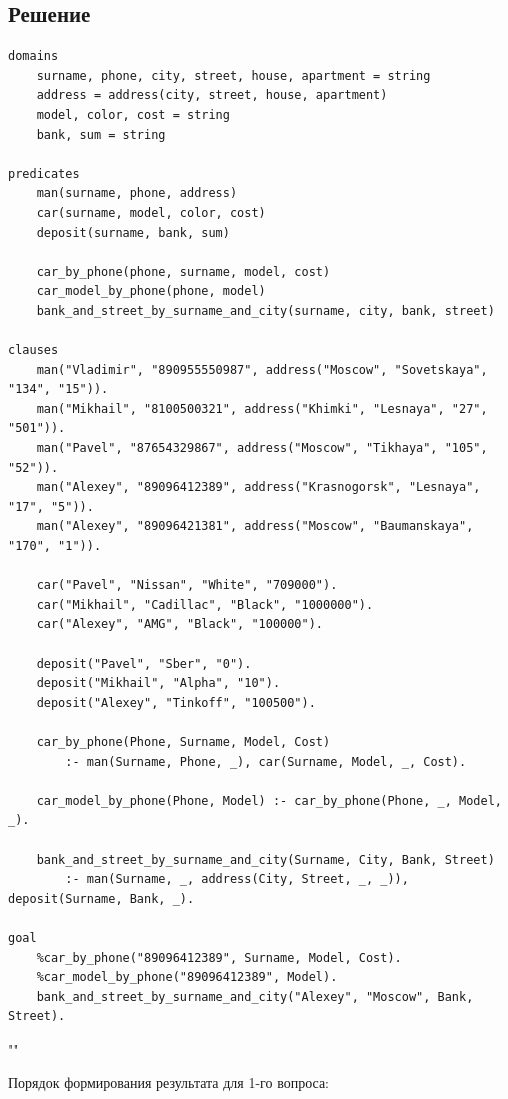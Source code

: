 \documentclass[12pt]{report}
\begin{document}
\subsection*{Решение}
\begin{lstlisting}
domains
	surname, phone, city, street, house, apartment = string
	address = address(city, street, house, apartment)
	model, color, cost = string
	bank, sum = string

predicates
	man(surname, phone, address)
	car(surname, model, color, cost)
	deposit(surname, bank, sum)
	
	car_by_phone(phone, surname, model, cost)
	car_model_by_phone(phone, model)
	bank_and_street_by_surname_and_city(surname, city, bank, street)

clauses
	man("Vladimir", "890955550987", address("Moscow", "Sovetskaya", "134", "15")).
	man("Mikhail", "8100500321", address("Khimki", "Lesnaya", "27", "501")).
	man("Pavel", "87654329867", address("Moscow", "Tikhaya", "105", "52")).
	man("Alexey", "89096412389", address("Krasnogorsk", "Lesnaya", "17", "5")).
	man("Alexey", "89096421381", address("Moscow", "Baumanskaya", "170", "1")).
	
	car("Pavel", "Nissan", "White", "709000").
	car("Mikhail", "Cadillac", "Black", "1000000").
	car("Alexey", "AMG", "Black", "100000").
	
	deposit("Pavel", "Sber", "0").
	deposit("Mikhail", "Alpha", "10").
	deposit("Alexey", "Tinkoff", "100500").
	
	car_by_phone(Phone, Surname, Model, Cost)
		:- man(Surname, Phone, _), car(Surname, Model, _, Cost).
	
	car_model_by_phone(Phone, Model) :- car_by_phone(Phone, _, Model, _).
	
	bank_and_street_by_surname_and_city(Surname, City, Bank, Street)
		:- man(Surname, _, address(City, Street, _, _)), deposit(Surname, Bank, _).

goal
	%car_by_phone("89096412389", Surname, Model, Cost).
	%car_model_by_phone("89096412389", Model).
	bank_and_street_by_surname_and_city("Alexey", "Moscow", Bank, Street).
\end{lstlisting}""\newline

Порядок формирования результата для 1-го вопроса:
\end{document}
